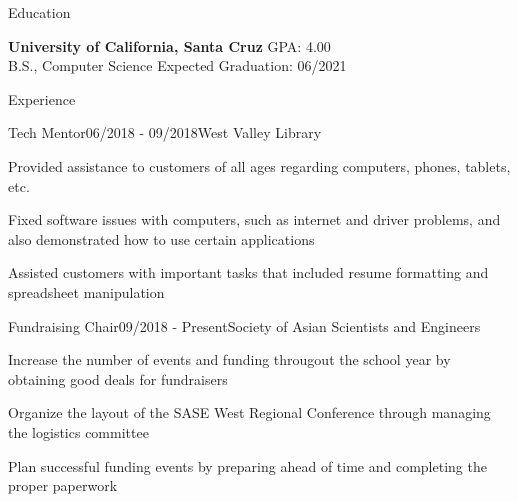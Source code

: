 \documentclass{resume}
\begin{document}
\begin{rSection}{Education}

{\bf University of California, Santa Cruz} \hfill {GPA: 4.00} 
\\ B.S., Computer Science \hfill {Expected Graduation: 06/2021}

\end{rSection}


\begin{rSection}{Experience}

\begin{rSubsection}{Tech Mentor}{06/2018 - 09/2018}{West Valley Library}{}
\item Provided assistance to customers of all ages regarding computers, phones, tablets, etc.
\item Fixed software issues with computers, such as internet and driver problems, and also demonstrated how to use certain applications
\item Assisted customers with important tasks that included resume formatting and spreadsheet manipulation
\end{rSubsection}

\begin{rSubsection}{Fundraising Chair}{09/2018 - Present}{Society of Asian Scientists and Engineers}{}
\item Increase the number of events and funding througout the school year by obtaining good deals for fundraisers
\item Organize the layout of the SASE West Regional Conference through managing the logistics committee
\item Plan successful funding events by preparing ahead of time and completing the proper paperwork
\end{rSubsection}

\end{rSection}
\end{document}
